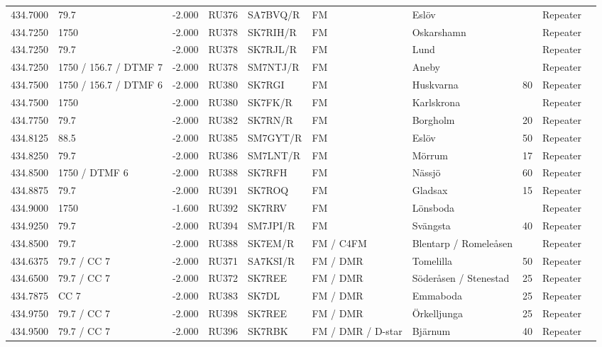 \begin{longtable}{lllllllrlr}
434.7000&79.7&-2.000&RU376&SA7BVQ/R&FM&Eslöv&&Repeater&\\
434.7250&1750&-2.000&RU378&SK7RIH/R&FM&Oskarshamn&&Repeater&\\
434.7250&79.7&-2.000&RU378&SK7RJL/R&FM&Lund&&Repeater&\\
434.7250&1750 / 156.7 / DTMF 7&-2.000&RU378&SM7NTJ/R&FM&Aneby&&Repeater&\\
434.7500&1750 / 156.7 / DTMF 6&-2.000&RU380&SK7RGI&FM&Huskvarna&80&Repeater&\\
434.7500&1750&-2.000&RU380&SK7FK/R&FM&Karlskrona&&Repeater&\\
434.7750&79.7&-2.000&RU382&SK7RN/R&FM&Borgholm&20&Repeater&\\
434.8125&88.5&-2.000&RU385&SM7GYT/R&FM&Eslöv&50&Repeater&\\
434.8250&79.7&-2.000&RU386&SM7LNT/R&FM&Mörrum&17&Repeater&\\
434.8500&1750 / DTMF 6&-2.000&RU388&SK7RFH&FM&Nässjö&60&Repeater&\\
434.8875&79.7&-2.000&RU391&SK7ROQ&FM&Gladsax&15&Repeater&\\
434.9000&1750&-1.600&RU392&SK7RRV&FM&Lönsboda&&Repeater&\\
434.9250&79.7&-2.000&RU394&SM7JPI/R&FM&Svängsta&40&Repeater&\\
434.8500&79.7&-2.000&RU388&SK7EM/R&FM / C4FM&Blentarp / Romeleåsen&&Repeater&\\
434.6375&79.7 / CC 7&-2.000&RU371&SA7KSI/R&FM / DMR&Tomelilla&50&Repeater&\\
434.6500&79.7 / CC 7&-2.000&RU372&SK7REE&FM / DMR&Söderåsen / Stenestad&25&Repeater&\\
434.7875&CC 7&-2.000&RU383&SK7DL&FM / DMR&Emmaboda&25&Repeater&\\
434.9750&79.7 / CC 7&-2.000&RU398&SK7REE&FM / DMR&Örkelljunga&25&Repeater&\\
434.9500&79.7 / CC 7&-2.000&RU396&SK7RBK&FM / DMR / D-star&Bjärnum&40&Repeater&\\
\end{longtable}
\clearpage
